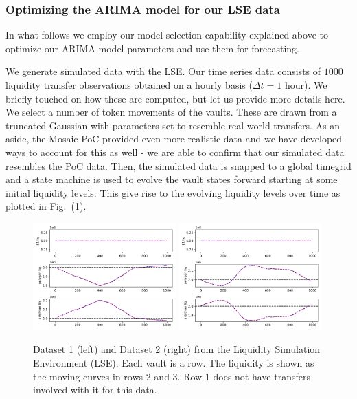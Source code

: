 \subsubsection*{Optimizing the ARIMA model for our LSE data}

In what follows we employ our model selection capability explained above to optimize our ARIMA model parameters and use them for forecasting.

We generate simulated data with the LSE. Our time series data consists of $1000$ liquidity transfer observations obtained on a hourly basis ($\Delta t = 1$ hour).
%
We briefly touched on how these are computed, but let us provide more details here. We select a number of token movements of the vaults. These are drawn from a truncated Gaussian with parameters set to resemble real-world transfers. As an aside, the Mosaic PoC provided even more realistic data and we have developed ways to account for this as well - we are able to confirm that our simulated data resembles the PoC data.
%
Then, the simulated data is snapped to a global timegrid and a state machine is used to evolve the vault states forward starting at some initial liquidity levels. This give rise to the evolving liquidity levels over time as plotted in Fig.~(\ref{fig:lse_datasets}).

\begin{figure}
    \centering
    \includegraphics[width=0.49\textwidth]{images/lse_results_feemodel_3_20_20211015_18_59_40_412997.png}
    \includegraphics[width=0.49\textwidth]{images/lse_results_feemodel_3_20_20211021_18_59_52_314364.png}
    \caption{Dataset 1 (left) and Dataset 2 (right) from the Liquidity Simulation Environment (LSE). Each vault is a row. The liquidity is shown as the moving curves in rows 2 and 3. Row 1 does not have transfers involved with it for this data.}
    \label{fig:lse_datasets}
\end{figure}

